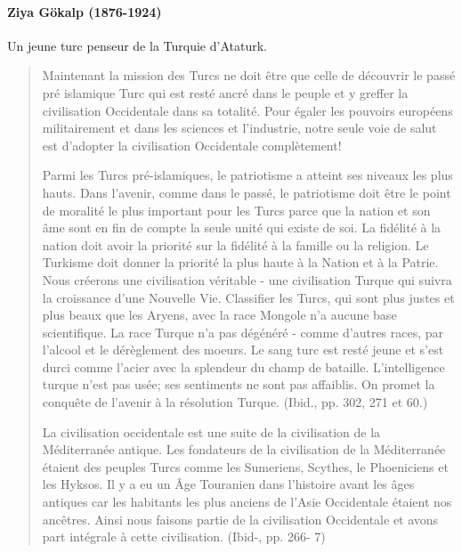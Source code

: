 \paragraph{Ziya Gökalp
(1876-1924)}    Un jeune turc penseur de la Turquie d'Ataturk.
  \begin{quote}
Maintenant la mission des Turcs ne doit être que celle de découvrir le
passé pré islamique Turc qui est resté ancré dans le peuple et y greffer
la civilisation Occidentale dans sa totalité. Pour égaler les pouvoirs
européens militairement et dans les sciences et l'industrie, notre seule
voie de salut est d'adopter la civilisation Occidentale complètement! 

Parmi les Turcs pré-islamiques, le patriotisme a atteint ses niveaux les
plus hauts. Dans l'avenir, comme dans le passé, le patriotisme doit être
le point de moralité le plus important pour les Turcs parce que la
nation et son âme sont en fin de compte la seule unité qui existe de
soi. La fidélité à la nation doit avoir la priorité sur la fidélité à la
famille ou la religion. Le Turkisme doit donner la priorité la plus
haute à la Nation et à la Patrie. Nous créerons une civilisation
véritable - une civilisation Turque qui suivra la croissance d'une
Nouvelle Vie. Classifier les Turcs, qui sont plus justes et plus beaux
que les Aryens, avec la race Mongole n'a aucune base scientifique. La
race Turque n'a pas dégénéré - comme d'autres races, par l'alcool et le
dérèglement des moeurs. Le sang turc est resté jeune et s'est durci
comme l'acier avec la splendeur du champ de bataille. L'intelligence
turque n'est pas usée; ses sentiments ne sont pas affaiblis. On promet
la conquête de l'avenir à la résolution Turque. (Ibid., pp. 302, 271 et
60.)

La civilisation occidentale est une suite de la civilisation de la
Méditerranée antique. Les fondateurs de la civilisation de la
Méditerranée étaient des peuples Turcs comme les Sumeriens, Scythes, le
Phoeniciens et les Hyksos. Il y a eu un Âge Touranien dans l'histoire
avant les âges antiques car les habitants les plus anciens de l'Asie
Occidentale étaient nos ancêtres. Ainsi nous faisons partie de la
civilisation Occidentale et avons part intégrale à cette civilisation.
(Ibid-, pp. 266- 7)


\end{quote}
